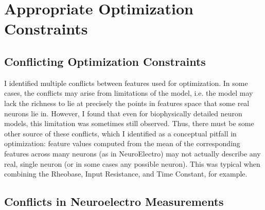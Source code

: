 
 

\section{Appropriate Optimization Constraints}
\subsection{Conflicting Optimization Constraints}
I identified multiple conflicts between features used for optimization.
In some cases, the conflicts may arise from limitations of the model, i.e. the model may lack the richness to lie at precisely the points in features space that some real neurons lie in.
However, I found that even for biophysically detailed neuron models, this limitation was sometimes still observed.
Thus, there must be some other source of these conflicts, which I identified as a conceptual pitfall in optimization: feature values computed from the mean of the corresponding features across many neurons (as in NeuroElectro) may not actually describe any real, single neuron (or in some cases any possible neuron). 
This was typical when combining the Rheobase, Input Resistance, and Time Constant, for example.

\subsection{Conflicts in Neuroelectro Measurements}
% 

